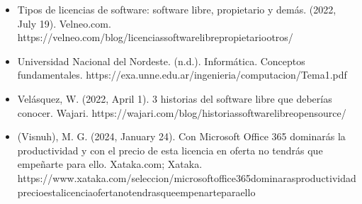 \documentclass[letterpaper,10pt,spanish]{sphinxmanual}
\begin{document}
\begin{itemize}
\item {} 
\sphinxAtStartPar
Tipos de licencias de software: software libre, propietario y demás. (2022, July 19). Velneo.com. https://velneo.com/blog/licencias\sphinxhyphen{}software\sphinxhyphen{}libre\sphinxhyphen{}propietario\sphinxhyphen{}otros/

\item {} 
\sphinxAtStartPar
Universidad Nacional del Nordeste. (n.d.). Informática. Conceptos fundamentales. https://exa.unne.edu.ar/ingenieria/computacion/Tema1.pdf

\item {} 
\sphinxAtStartPar
Velásquez, W. (2022, April 1). 3 historias del software libre que deberías conocer. Wajari. https://wajari.com/blog/historias\sphinxhyphen{}software\sphinxhyphen{}libre\sphinxhyphen{}open\sphinxhyphen{}source/

\item {} 
\sphinxAtStartPar
(Visnuh), M. G. (2024, January 24). Con Microsoft Office 365 dominarás la productividad y con el precio de esta licencia en oferta no tendrás que empeñarte para ello. Xataka.com; Xataka. https://www.xataka.com/seleccion/microsoft\sphinxhyphen{}office\sphinxhyphen{}365\sphinxhyphen{}dominaras\sphinxhyphen{}productividad\sphinxhyphen{}precio\sphinxhyphen{}esta\sphinxhyphen{}licencia\sphinxhyphen{}oferta\sphinxhyphen{}no\sphinxhyphen{}tendras\sphinxhyphen{}que\sphinxhyphen{}empenarte\sphinxhyphen{}para\sphinxhyphen{}ello

\end{itemize}



\renewcommand{\indexname}{Índice}
\printindex
\end{document}
